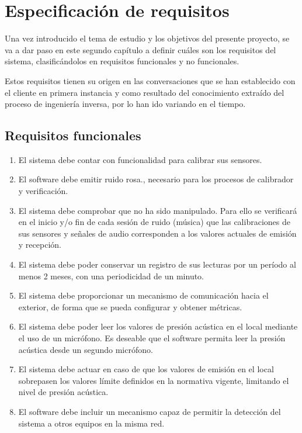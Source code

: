 \chapter{Especificación de requisitos} \label{cap:capitulo2}

Una vez introducido el tema de estudio y los objetivos del presente proyecto, se va a dar paso en este segundo capítulo a definir cuáles son los requisitos del sistema, clasificándolos en requisitos funcionales y no funcionales.

Estos requisitos tienen su origen en las conversaciones que se han establecido con el cliente en primera instancia y como resultado del conocimiento extraído del proceso de ingeniería inversa, por lo han ido variando en el tiempo.

\section{Requisitos funcionales} \label{sec:rf}

\begin{enumerate}
    \item El sistema debe contar con funcionalidad para calibrar sus sensores.

    \item El software debe emitir ruido rosa., necesario para los procesos de calibrador y verificación.

    \item El sistema debe comprobar que no ha sido manipulado. Para ello se verificará en el inicio y/o fin de cada sesión de ruido (música) que las calibraciones de sus sensores y señales de audio corresponden a los valores actuales de emisión y recepción.

    \item El sistema debe poder conservar un registro de sus lecturas por un período al menos 2 meses, con una periodicidad de un minuto.

    \item El sistema debe proporcionar un mecanismo de comunicación hacia el exterior, de forma que se pueda configurar y obtener métricas.

    \item El sistema debe poder leer los valores de presión acústica en el local mediante el uso de un micrófono.
    	\subitem Es deseable que el software permita leer la presión acústica desde un segundo micrófono.

    \item El sistema debe actuar en caso de que los valores de emisión en el local sobrepasen los valores límite definidos en la normativa vigente, limitando el nivel de presión acústica.

    \item El software debe incluir un mecanismo capaz de permitir la detección del sistema a otros equipos en la misma red.
\end{enumerate}

